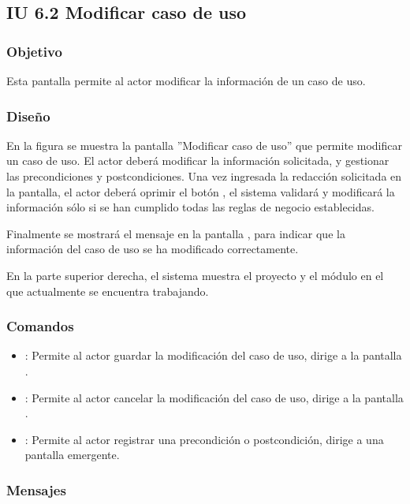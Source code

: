 \subsection{IU 6.2 Modificar caso de uso}

\subsubsection{Objetivo}
	Esta pantalla permite al actor modificar la información de un caso de uso.
\subsubsection{Diseño}
	En la figura  se muestra la pantalla ''Modificar caso de uso'' que permite modificar un caso de uso. El actor deberá modificar la información solicitada, y gestionar las precondiciones y postcondiciones.
	Una vez ingresada la redacción solicitada en la pantalla, el actor deberá oprimir el botón , el sistema validará y modificará la información sólo si se han cumplido todas las reglas de negocio establecidas.
	
	Finalmente se mostrará el mensaje  en la pantalla , para indicar que la información del caso de uso se ha modificado correctamente.
	
	En la parte superior derecha, el sistema muestra el proyecto y el módulo en el que actualmente se encuentra trabajando.

\subsubsection{Comandos}
\begin{itemize}
	\item {}: Permite al actor guardar la modificación del caso de uso, dirige a la pantalla .
	\item {}: Permite al actor cancelar la modificación del caso de uso, dirige a la pantalla .
	\item {}: Permite al actor registrar una precondición o postcondición, dirige a una pantalla emergente.
\end{itemize}

\subsubsection{Mensajes}

